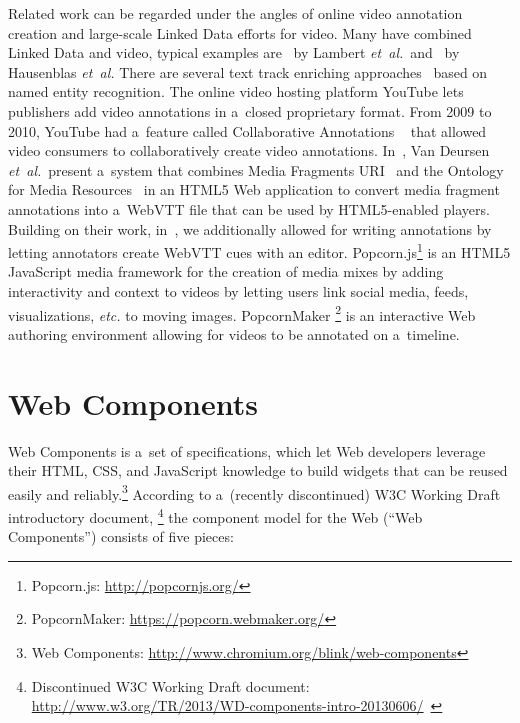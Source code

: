\documentclass[runningheads,a4paper]{llncs}
\begin{document}
Related work can be regarded under the angles
of online video annotation creation and large-scale Linked Data 
efforts for video.
Many have combined Linked Data and video,
typical examples are~\cite{lambert2010linkeddata} by Lambert \emph{et~al.}\
and~\cite{hausenblas2009im} by Hausenblas \emph{et~al.}
There are several text track enriching approaches~\cite{li2013enriching,li2012creating,yi2012synote,steiner2010semwebvid}
based on named entity recognition.
The online video hosting platform YouTube
lets publishers add video annotations
in a~closed proprietary format.
From 2009 to 2010, YouTube had a~feature called
Collaborative Annotations%
~\cite{fink2009collaborativeannotations}
that allowed video consumers to collaboratively
create video annotations.
In~\cite{vandeursen2012mediafragmentannotations},
Van Deursen \emph{et~al.}\ present a~system
that combines Media Fragments URI~\cite{troncy2012mediafragments}
and the Ontology for Media Resources~\cite{lee2012mediaontology}
in an HTML5 Web application to convert
media fragment annotations into a~WebVTT file
that can be used by HTML5-enabled players.
Building on their work, in~\cite{steiner2014webvtt},
we additionally allowed for writing annotations by
letting annotators create WebVTT cues with an editor.
Popcorn.js\footnote{Popcorn.js: \url{http://popcornjs.org/}}
is an HTML5 JavaScript media framework
for the creation of media mixes
by adding interactivity and context to videos
by letting users link social media, feeds,
visualizations, \emph{etc.} to moving images.
PopcornMaker%
\footnote{PopcornMaker: \url{https://popcorn.webmaker.org/}}
is an interactive Web authoring environment
allowing for videos to be annotated on a~timeline.

\section{Web Components}

Web Components is a~set of specifications, which let Web developers leverage
their HTML, CSS, and JavaScript knowledge to build widgets
that can be reused easily and reliably.\footnote{Web Components:
\url{http://www.chromium.org/blink/web-components}}
According to a~(recently discontinued) W3C Working Draft introductory document,%
\footnote{Discontinued W3C Working Draft document:
\url{http://www.w3.org/TR/2013/WD-components-intro-20130606/}~\cite{cooney2013webcomponents}}
the component model for the Web (``Web Components'') consists of five pieces:
\end{document}
